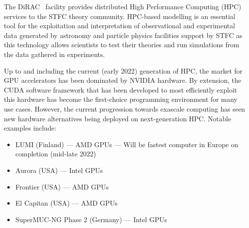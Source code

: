 

The DiRAC~\cite{dirac_distributed_nodate} facility provides distributed High Performance Computing (HPC) services to the STFC theory community.
HPC-based modelling is an essential tool for the exploitation and interpretation of observational and experimental data generated by astronomy and particle physics facilities support by STFC as this technology allows scientists to test their theories and run simulations from the data gathered in experiments.

Up to and including the current (early 2022) generation of HPC, the market for GPU accelerators has been dominated by NVIDIA hardware.
By extension, the CUDA software framework that has been developed to most efficiently exploit this hardware has become the first-choice programming environment for many use cases.
However, the current progression towards exascale computing has seen new hardware alternatives being deployed on next-generation HPC.
Notable examples include:

\begin{itemize}
	\item LUMI (Finland) --- AMD GPUs --- Will be fastest computer in Europe on completion (mid-late 2022)
	\item Aurora (USA) --- Intel GPUs
	\item Frontier (USA) --- AMD GPUs
	\item El Capitan (USA) --- AMD GPUs
	\item SuperMUC-NG Phase 2 (Germany) --- Intel GPUs
\end{itemize}
